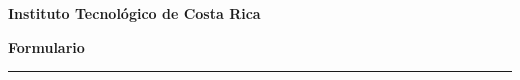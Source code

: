 \documentclass{article}
\begin{document}
\textbf{Instituto Tecnológico de Costa Rica}
\begin{center}
	\Huge
	\textbf{Formulario}
\end{center}
\vspace{0.2in}
\hrule
\vspace{0.2in}




\end{document}
